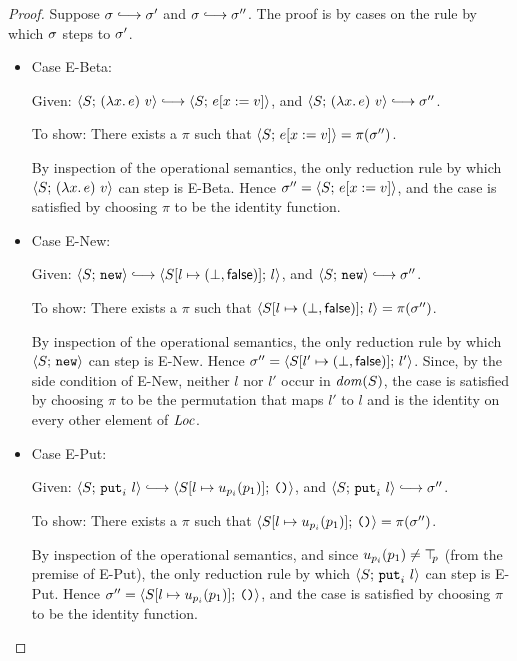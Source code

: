 \begin{proof}
  Suppose $\conf \parstepsto \conf'$ and $\conf \parstepsto \conf''$.
  The proof is by cases on the rule by which $\sigma$ steps to
  $\sigma'$.

  \begin{itemize}

  \item Case {\sc E-Beta}:

    Given: $\config{S}{\app{(\lam{x}{e})}{v}} \parstepsto
    \config{S}{\subst{e}{x}{v}}$, and
    $\config{S}{\app{(\lam{x}{e})}{v}} \parstepsto \conf''$.

    To show: There exists a $\pi$ such that
    $\langle S;\, e[x := v] \rangle = \pi(\sigma'')$.

    By inspection of the operational semantics, the only reduction
    rule by which $\langle S;\, (\lambda x.\,e)~v \rangle$ can step is
    {\sc E-Beta}.  Hence $\sigma'' = \langle S;\, e[x := v] \rangle$,
    and the case is satisfied by choosing $\pi$ to be the identity
    function.

  \item Case {\sc E-New}:

    Given: $\config{S}{\NEW} \parstepsto
    \config{\extS{S}{l}{\bot}{\frozenfalse}}{l}$, and
    $\config{S}{\NEW} \parstepsto \conf''$.

    To show: There exists a $\pi$ such that
    $\langle S[l \mapsto (\bot, \textsf{false})];\, l \rangle = \pi(\sigma'')$.

    By inspection of the operational semantics, the only reduction
    rule by which $\langle S;\, \mbox{\texttt{new}} \rangle$ can step is {\sc E-New}.  Hence
    $\sigma'' = \langle S[l' \mapsto (\bot, \textsf{false})];\, l' \rangle$.  Since,
    by the side condition of {\sc E-New}, neither $l$ nor $l'$ occur
    in $\mathit{dom}(S)$, the case is satisfied by choosing $\pi$ to be the
    permutation that maps $l'$ to $l$ and is the identity on every
    other element of $\mathit{Loc}$.

  \item Case {\sc E-Put}:

    Given: $\config{S}{\putiexp{l}} \parstepsto
    \config{\extSRaw{S}{l}{u_{p_i}(p_1)}}{\unit}$, and
    $\config{S}{\putiexp{l}} \parstepsto \conf''$.

    To show: There exists a $\pi$ such that
    $\langle S[l \mapsto u_{p_i}(p_1)];\, \mbox{\texttt{()}} \rangle = \pi(\sigma'')$.

    By inspection of the operational semantics, and since
    $u_{p_i}(p_1) \neq \top\hspace{-0.85mm}_{p}$ (from the premise of {\sc E-Put}), the
    only reduction rule by which $\langle S;\, \mbox{\texttt{put}}_i~l \rangle$ can step is
    {\sc E-Put}.  Hence $\sigma'' =
    \langle S[l \mapsto u_{p_i}(p_1)];\, \mbox{\texttt{()}} \rangle$, and the case is
    satisfied by choosing $\pi$ to be the identity function.


\end{itemize}
\end{proof}
